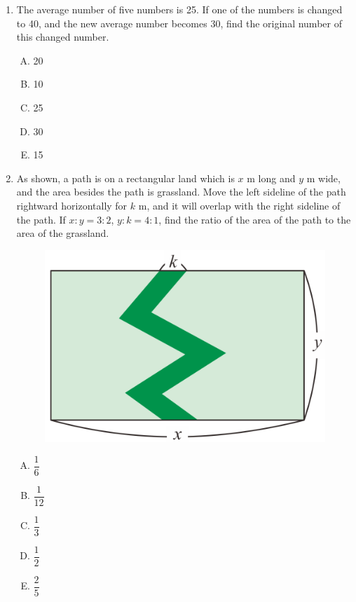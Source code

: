 \documentclass[12pt]{scrartcl}
\begin{document}
\begin{enumerate}
    \newpage
    \item The average number of five numbers is 25. If one of the numbers is changed to 40, and the new average number becomes 30, find the original number of this changed number.
    \begin{multicols}{5}
        \begin{enumerate}[(A)]
            \item 20
            \item 10
            \item 25
            \item 30
            \item 15
        \end{enumerate}
    \end{multicols} \hrulefill

    \item As shown, a path is on a rectangular land which is $x$ m long and $y$ m wide, and the area besides the path is grassland. Move the left sideline of the path rightward horizontally for $k$ m, and it will overlap with the right sideline of the path. If $x:y = 3:2$, $y:k = 4:1$, find the ratio of the area of the path to the area of the grassland.
    \begin{figure}[h]
        \centering
        \includegraphics[scale=0.4]{StarGen/0Figure/wmi2023G6A-num8.png}
    \end{figure}
    \begin{multicols}{5}
        \begin{enumerate}[(A)]
            \item $\dfrac{1}{6}$
            \item $\dfrac{1}{12}$
            \item $\dfrac{1}{3}$
            \item $\dfrac{1}{2}$
            \item $\dfrac{2}{5}$
        \end{enumerate}
    \end{multicols} \hrulefill
\end{enumerate}
\end{document}

